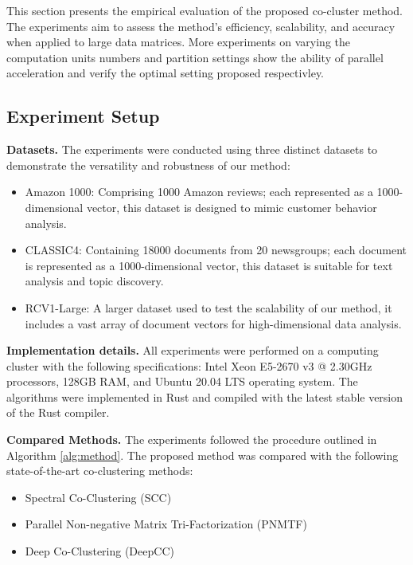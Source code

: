 \documentclass[journal]{IEEEtran}
\renewcommand{\cite}[1]{~\autocite{#1}}
\begin{document}
This section presents the empirical evaluation of the proposed co-cluster method. The experiments aim to assess the method's efficiency, scalability, and accuracy when applied to large data matrices. More experiments on varying the computation units numbers and partition settings show the ability of parallel acceleration and verify the optimal setting proposed respectivley.
\subsection{Experiment Setup}

\textbf{Datasets.}
The experiments were conducted using three distinct datasets to demonstrate the versatility and robustness of our method:

\begin{itemize}
  \item Amazon 1000: Comprising 1000 Amazon reviews; each represented as a 1000-dimensional vector, this dataset is designed to mimic customer behavior analysis.
  \item CLASSIC4: Containing 18000 documents from 20 newsgroups; each document is represented as a 1000-dimensional vector, this dataset is suitable for text analysis and topic discovery.
  \item RCV1-Large: A larger dataset used to test the scalability of our method, it includes a vast array of document vectors for high-dimensional data analysis.
\end{itemize}

\textbf{Implementation details.}
All experiments were performed on a computing cluster with the following specifications: Intel Xeon E5-2670 v3 @ 2.30GHz processors, 128GB RAM, and Ubuntu 20.04 LTS operating system. The algorithms were implemented in Rust and compiled with the latest stable version of the Rust compiler.

\textbf{Compared Methods.}
The experiments followed the procedure outlined in Algorithm \ref{alg:method}. The proposed method was compared with the following state-of-the-art co-clustering methods:

\begin{itemize}
  \item Spectral Co-Clustering (SCC) \cite{dhillon2001CoclusteringDocumentsWords}
  \item Parallel Non-negative Matrix Tri-Factorization (PNMTF)\cite{chen2023ParallelNonNegativeMatrix}
  \item Deep Co-Clustering (DeepCC)\cite{dongkuanxu2019DeepCoClustering}
\end{itemize}
\end{document}
